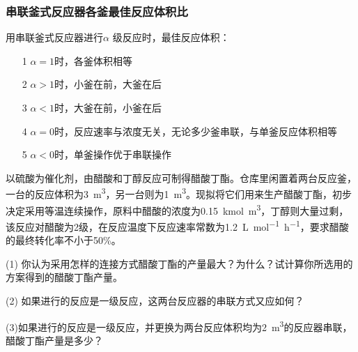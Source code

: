 \begin{frame}
    \frametitle{串联釜式反应器各釜最佳反应体积比}

    用串联釜式反应器进行$\alpha$ 级反应时，最佳反应体积：
    \begin{itemize}
        \item[1] $\alpha=1$时，各釜体积相等
        \item[2] $\alpha>1$时，小釜在前，大釜在后
        \item[3] $\alpha<1$时，大釜在前，小釜在后
        \item[4] $\alpha=0$时，反应速率与浓度无关，无论多少釜串联，与单釜反应体积相等
        \item[5] $\alpha<0$时，单釜操作优于串联操作
    \end{itemize}

\end{frame}


\begin{frame}[t]{}
    \begin{example}
        以硫酸为催化剂，由醋酸和丁醇反应可制得醋酸丁酯。仓库里闲置着两台反应釜，一台的反应体积为\SI{3}{m^3}，另一台则为\SI{1}{m^3}。现拟将它们用来生产醋酸丁酯，初步决定采用等温连续操作，原料中醋酸的浓度为\SI{0.15}{kmol.m^3}，丁醇则大量过剩，该反应对醋酸为2级，在反应温度下反应速率常数为\SI{1.2}{L.mol^{-1}.h^{-1}}，要求醋酸的最终转化率不小于50\%。
        
        (1) 你认为采用怎样的连接方式醋酸丁酯的产量最大？为什么？试计算你所选用的方案得到的醋酸丁酯产量。
        
        (2) 如果进行的反应是一级反应，这两台反应器的串联方式又应如何？

        (3)如果进行的反应是一级反应，并更换为两台反应体积均为\SI{2}{m^3}的反应器串联，醋酸丁酯产量是多少？
    \end{example}

\end{frame}